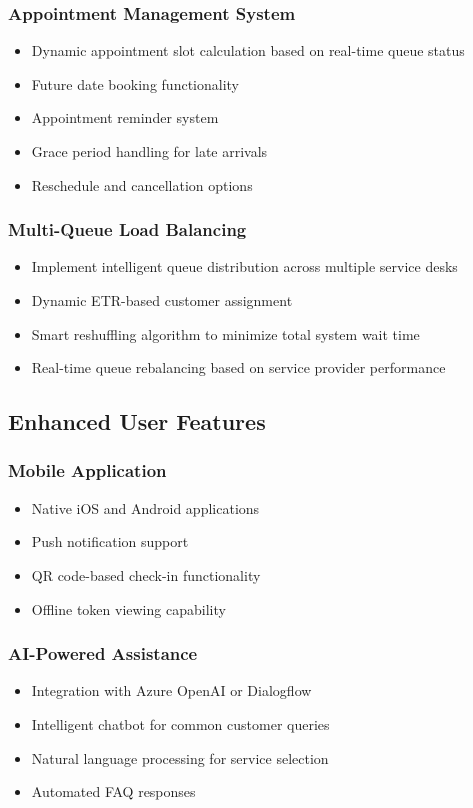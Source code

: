 \documentclass[12pt,a4paper]{report}
\begin{document}
\subsubsection{Appointment Management System}
\begin{itemize}
    \item Dynamic appointment slot calculation based on real-time queue status
    \item Future date booking functionality
    \item Appointment reminder system
    \item Grace period handling for late arrivals
    \item Reschedule and cancellation options
\end{itemize}

\subsubsection{Multi-Queue Load Balancing}
\begin{itemize}
    \item Implement intelligent queue distribution across multiple service desks
    \item Dynamic ETR-based customer assignment
    \item Smart reshuffling algorithm to minimize total system wait time
    \item Real-time queue rebalancing based on service provider performance
\end{itemize}

\subsection{Enhanced User Features}

\subsubsection{Mobile Application}
\begin{itemize}
    \item Native iOS and Android applications
    \item Push notification support
    \item QR code-based check-in functionality
    \item Offline token viewing capability
\end{itemize}

\subsubsection{AI-Powered Assistance}
\begin{itemize}
    \item Integration with Azure OpenAI or Dialogflow
    \item Intelligent chatbot for common customer queries
    \item Natural language processing for service selection
    \item Automated FAQ responses
\end{itemize}
\end{document}
